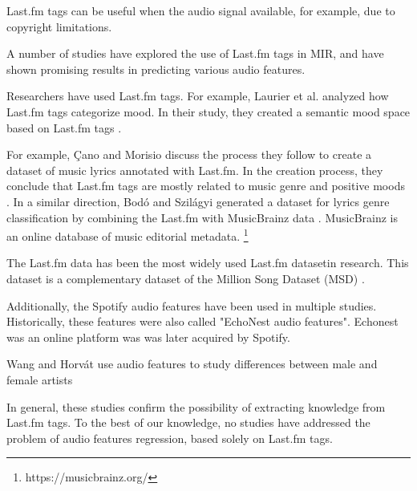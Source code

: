 \documentclass[sn-mathphys]{sn-jnl}%
\theoremstyle{thmstyleone}%
\theoremstyle{thmstyletwo}%
\theoremstyle{thmstylethree}%
\begin{document}
Last.fm tags can be useful when the audio signal available,
for example, due to copyright limitations.

A number of studies have explored the use of Last.fm tags in MIR,
and have shown promising results in predicting various audio features.

Researchers have used Last.fm tags.
For example, Laurier et al. analyzed how Last.fm tags categorize mood.
In their study, they created a semantic mood space based on Last.fm tags \cite{laurier2009music}.

For example, {\c{C}}ano and Morisio discuss the process they follow to create a dataset of music
lyrics annotated with Last.fm.
In the creation process, they conclude that Last.fm tags are mostly related to music genre
and positive moods \cite{ccano2017music}.
In a similar direction, Bod{\'o} and Szil{\'a}gyi generated a dataset for lyrics genre classification
by combining the Last.fm with MusicBrainz data \cite{bodo2018connecting}.
MusicBrainz \footnotemark[1] is an online database of music editorial metadata.
\footnote[1]{https://musicbrainz.org/}

The Last.fm data has been the most widely used Last.fm dataset\footnotemark[2] in research.
This dataset is a complementary dataset of the Million Song Dataset (MSD) \cite{Bertin-Mahieux2011}.



Additionally, the Spotify audio features have been used in multiple studies.
Historically, these features were also called "EchoNest audio features".
Echonest was an online platform was was later acquired by Spotify.

Wang and Horv{\'a}t use audio features to study differences between male and female artists \cite{wang2019gender}


In general, these studies confirm the possibility of extracting knowledge from Last.fm tags.
To the best of our knowledge, no studies have addressed the problem of audio features regression, based solely on Last.fm tags.
\end{document}
